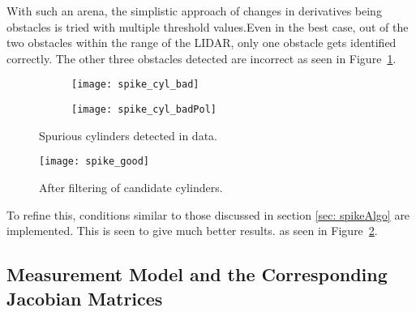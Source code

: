 With such an arena, the simplistic approach of changes in derivatives being obstacles is tried with multiple threshold values.Even in the best case, out of the two obstacles within the range of the LIDAR, only one obstacle gets identified correctly. The other three obstacles detected are incorrect as seen in Figure~\ref{fig:Spike_cylinders_bad}.  

\begin{figure}[h!]
    \centering
    \begin{subfigure}[b]{0.45\textwidth}
	\texttt{[image: spike\_cyl\_bad]}
    \end{subfigure}
    \quad %
    \begin{subfigure}[b]{0.45\textwidth}
        \texttt{[image: spike\_cyl\_badPol]}
    \end{subfigure}%
	\caption{Spurious cylinders detected in data.}
	\label{fig:Spike_cylinders_bad}
\end{figure}

\begin{figure}[h!]
\centering
\texttt{[image: spike\_good]}
\caption{After filtering of candidate cylinders.}
\label{fig:spike_good}
\end{figure}

To refine this, conditions similar to those discussed in section \ref{sec: spikeAlgo} are implemented. This is seen to give much better results. as seen in Figure~\ref{fig:spike_good}. 



\subsection{Measurement Model and the Corresponding Jacobian Matrices}
\label{sec:Spike_math}

